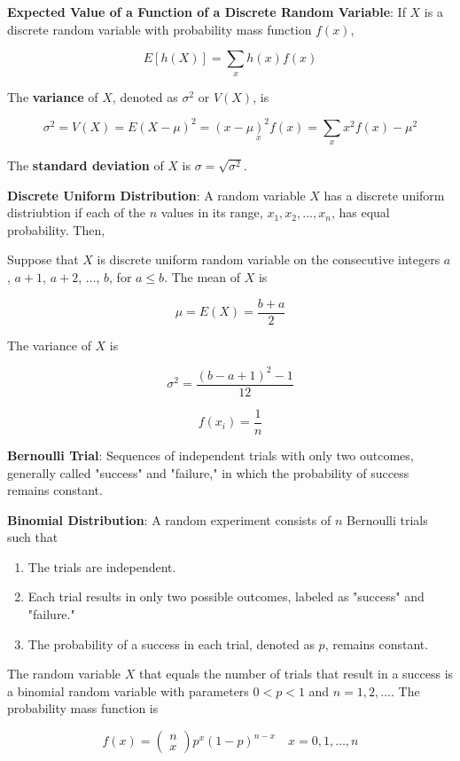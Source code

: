 \documentclass{article}
\begin{document}
\noindent\textbf{\color{blue}Expected Value of a Function of a Discrete Random Variable}: If $X$ is a discrete random variable with probability mass function $f(x)$,

$$E[h(X)]=\underset{x}{\sum}h(x)f(x)$$

The \textbf{variance} of $X$, denoted as $\sigma^2$ or $V(X)$, is

$$\sigma^2=V(X)=E(X-\mu)^2=\underset{x}{(x-\mu)^2f(x)}=\underset{x}{\sum}x^2f(x)-\mu^2$$

The \textbf{standard deviation} of $X$ is $\sigma=\sqrt{\sigma^2}$.

\noindent\textbf{\color{blue}Discrete Uniform Distribution}: A random variable $X$ has a discrete uniform distriubtion if each of the $n$ values in its range, $x_1,x_2,\ldots,x_n$, has equal probability. Then,

Suppose that $X$ is discrete uniform random variable on the consecutive integers $a$, $a+1$, $a+2$, $\ldots$, $b$, for $a\le b$. The mean of $X$ is 

$$\mu=E(X)=\frac{b+a}{2}$$

The variance of $X$ is 

$$\sigma^2=\frac{(b-a+1)^2-1}{12}$$

$$f(x_i)=\frac{1}{n}$$

\noindent\textbf{Bernoulli Trial}: Sequences of independent trials with only two outcomes, generally called "success" and "failure," in which the probability of success remains constant.

\noindent\textbf{\color{blue}Binomial Distribution}: A random experiment consists of $n$ Bernoulli trials such that

\begin{enumerate}
    \item The trials are independent.
    \item Each trial results in only two possible outcomes, labeled as "success" and "failure."
    \item The probability of a success in each trial, denoted as $p$, remains constant.
\end{enumerate}

The random variable $X$ that equals the number of trials that result in a success is a binomial random variable with parameters $0<p<1$ and $n=1,2,\ldots$. The probability mass function is

$$f(x)=\begin{pmatrix}n\\x\end{pmatrix}p^x(1-p)^{n-x}\quad x=0,1,\ldots,n$$
\end{document}
